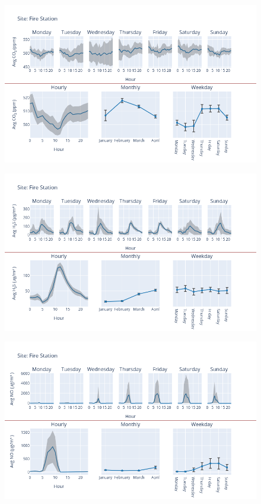 \documentclass[12pt, oneside]{book}
\begin{document}
{ 
{\begin{figure}[H] 
 \centering 
\includegraphics[width=.88\textwidth, keepaspectratio]{image92} 
 \end{figure}}{} 

{\begin{figure}[H] 
 \centering 
\includegraphics[width=.88\textwidth, keepaspectratio]{image93} 
 \end{figure}}{} 

{\begin{figure}[H] 
 \centering 
\includegraphics[width=.88\textwidth, keepaspectratio]{image94} 
 \end{figure}}{} 

}
\end{document}
